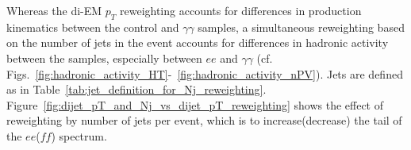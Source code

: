\documentclass[dissertation.tex]{subfiles}
\begin{document}
Whereas the di-EM $p_{T}$ reweighting accounts for differences in production kinematics between the control and $\gamma\gamma$ samples, a simultaneous reweighting based on the number of jets in the event accounts for differences in hadronic activity between the samples, especially between $ee$ and $\gamma\gamma$ (cf. Figs.~\ref{fig:hadronic_activity_HT}-~\ref{fig:hadronic_activity_nPV}).  Jets are defined as in Table~\ref{tab:jet_definition_for_Nj_reweighting}.  Figure~\ref{fig:dijet_pT_and_Nj_vs_dijet_pT_reweighting} shows the effect of reweighting by number of jets per event, which is to increase(decrease) the tail of the $ee$($\mathit{ff}$) \MET spectrum.

\begin{figure}
	\centering
	\hspace{1cm}

\end{figure}
\end{document}
